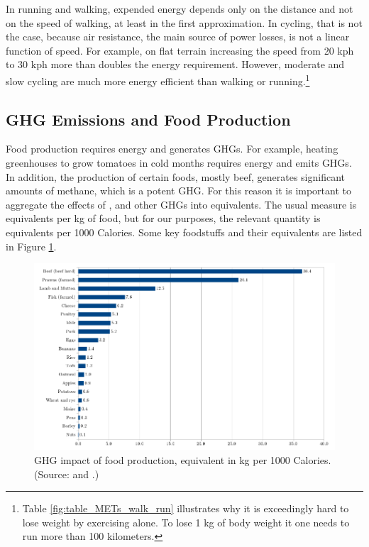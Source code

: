 \documentclass{article}[12pt,letterpaper]
\begin{document}
In running and walking, expended energy depends only on the distance and not on the speed of walking, at least in the first approximation. In cycling, that is not the case, because air resistance, the main source of power losses, is not a linear function of speed. For example, on flat terrain increasing the speed from 20 kph to 30 kph more than doubles the energy requirement. However, moderate and slow cycling are much more energy efficient than walking or running.\footnote{Table \ref{fig:table_METs_walk_run} illustrates why it is exceedingly hard to lose weight by exercising alone. To lose 1 kg of body weight it one needs to run more than 100 kilometers.} 

\subsection{GHG Emissions and Food Production}
Food production requires energy and generates GHGs. For example, heating greenhouses to grow tomatoes in cold months requires energy and emits GHGs. In addition, the production of certain foods, mostly beef,  generates significant amounts of methane, which is a potent GHG. For this reason it is important to aggregate the effects of \cadi, \methane and other GHGs into \cadi equivalents. The usual measure is \cadi equivalents per kg of food, but for our purposes, the relevant quantity is \cadi equivalents per 1000 Calories. Some key foodstuffs and their \cadi equivalents are listed in Figure \ref{fig:table-ghg-per-1000-calories}.

\begin{figure}
  \centering
    \caption{GHG impact of food production, \cadi equivalent in kg per 1000 Calories. (Source: \citet{carbon-footprint-food-methane} and \citet{poore-nemecek-2018}.)}
    \label{fig:table-ghg-per-1000-calories}
  \includegraphics[scale=0.5]{fig_3.png}
\end{figure}
\end{document}
